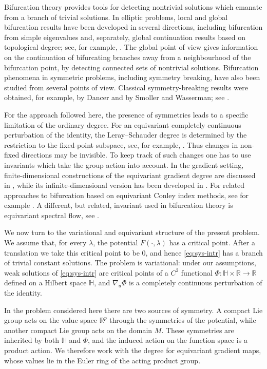\documentclass[reqno,twoside,12pt]{amsart}
\newcommand{\bH}{\mathbb{H}}
\newcommand{\bR}{\mathbb{R}}
\numberwithin{equation}{section} \errorcontextlines=0
\begin{document}
Bifurcation theory provides tools for detecting nontrivial solutions which emanate from a branch of trivial solutions. In elliptic problems, local and global bifurcation results have been developed in several directions, including bifurcation from simple eigenvalues and, separately, global continuation results based on topological degree; see, for example, \cite{CrandallRabinowitz,Nirenberg,Rabinowitz1971,Rabinowitz1986}. The global point of view gives information on the continuation of bifurcating branches away from a neighbourhood of the bifurcation point, by detecting connected sets of nontrivial solutions. Bifurcation phenomena in symmetric problems, including symmetry breaking, have also been studied from several points of view. Classical symmetry-breaking results were obtained, for example, by Dancer and by Smoller and Wasserman; see \cite{Dancer1979,Dancer1982,SmollerWasserman}.

For the approach followed here, the presence of symmetries leads to a specific limitation of the ordinary degree. For an equivariant completely continuous perturbation of the identity, the Leray--Schauder degree is determined by the restriction to the fixed-point subspace, see, for example, \cite{Dancer1982}. Thus changes in non-fixed directions may be invisible. To keep track of such changes one has to use invariants which take the group action into account. In the gradient setting, finite-dimensional constructions of the equivariant gradient degree are discussed in \cite{Geba}, while its infinite-dimensional version has been developed in \cite{Ryb2005milano}. For related approaches to bifurcation based on equivariant Conley index methods, see for example \cite{GolRyb2013,Izydorek}. A different, but related, invariant used in bifurcation theory is equivariant spectral flow, see \cite{IJSW2025}.

We now turn to the variational and equivariant structure of the present problem. We assume that, for every $\lambda$, the potential $F(\cdot,\lambda)$ has a critical point. After a translation we take this critical point to be $0$, and hence \eqref{eq:sys-intr} has a branch of trivial constant solutions. The problem is variational: under our assumptions, weak solutions of \eqref{eq:sys-intr} are critical points of a $C^2$ functional $\Phi:\bH\times\bR\to\bR$ defined on a Hilbert space $\bH$, and $\nabla_u\Phi$ is a completely continuous perturbation of the identity.

In the problem considered here there are two sources of symmetry. A compact Lie group acts on the value space $\bR^p$ through the symmetries of the potential, while another compact Lie group acts on the domain $M$. These symmetries are inherited by both $\bH$ and $\Phi$, and the induced action on the function space is a product action. We therefore work with the degree for equivariant gradient maps, whose values lie in the Euler ring of the acting product group.
\end{document}
